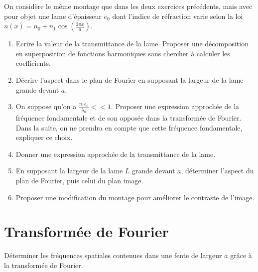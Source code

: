 \documentclass{article}
\begin{document}
On considère le même montage que dans les deux exercices précédents, mais avec pour objet une lame d'épaisseur $e_0$ dont l'indice de réfraction varie selon la loi $n(x) = n_0 + n_1 \cos \left( \frac{2\pi x}{a} \right)$.
\begin{enumerate}
  \item Ecrire la valeur de la transmittance de la lame. Proposer une décomposition en superposition de fonctions harmoniques sans chercher à calculer les coefficients. 
  \item Décrire l'aspect dans le plan de Fourier en supposant la largeur de la lame grande devant $a$. 
  \item On suppose qu'on a $\frac{n_1 e_0}{\lambda_0} <<1. $ Proposer une expression approchée de la fréquence fondamentale et de son opposée dans la transformée de Fourier. Dans la suite, on ne prendra en compte que cette fréquence fondamentale, expliquer ce choix. 
  \item Donner une expression approchée de la transmittance de la lame.
  \item En supposant la largeur de la lame $L$ grande devant $a$, déterminer l'aspect du plan de Fourier, puis celui du plan image. 
  \item Proposer une modification du montage pour améliorer le contraste de l'image. 
\end{enumerate} 
\section{Transformée de Fourier}

Déterminer les fréquences spatiales contenues dans une fente de largeur $a$ grâce à la transformée de Fourier. 
\end{document}
